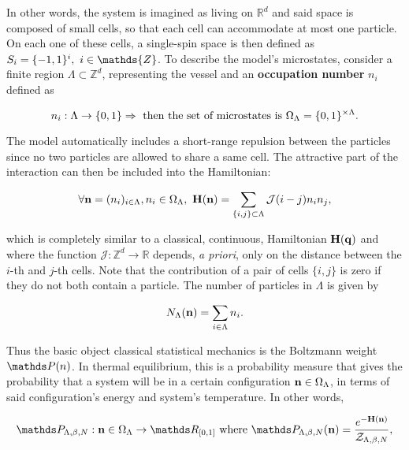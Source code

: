 \documentclass{homework}
\begin{document}
In other words, the system is imagined as living on $\mathds{R}^d$ and said space is composed of small cells, so that each cell can accommodate at most one particle. On each one of these cells, a single-spin space is then defined as $S_i = \{-1, 1\}^{i}, \blanky i \in \mathds{Z}$. To describe the model's microstates, consider a finite region $\Lambda \subset \mathds{Z}^d$, representing the vessel and an \textbf{occupation number} $n_i$ defined as 

\begin{equation}
    n_i : \Lambda \rightarrow \{0,1\} \Rightarrow \textnormal{ then the set of microstates is } \Omega_{\Lambda} = \{0, 1\}^{\times \Lambda}.
\end{equation}

The model automatically includes a short-range repulsion between the particles since no two particles are allowed to share a same cell. The attractive part of the interaction can then be included into the Hamiltonian:

$$
    \forall {\bf n} = (n_i)_{i \in \Lambda}, n_i \in \Omega_{\Lambda}, \textnormal{ } {\bf H}({\bf n}) = \sum_{\{i,j\} \subset \Lambda} \mathcal{J}(i-j) n_i n_j, 
$$

which is completely similar to a classical, continuous, Hamiltonian ${\bf H}({\bf q})$ and where the function $\mathcal{J}: \mathds{Z}^d \rightarrow \mathds{R}$ depends, \textit{a priori}, only on the distance between the $i$-th and $j$-th cells. Note that the contribution of a pair of cells $\{i,j\}$ is zero if they do not both contain a particle. The number of particles in $\Lambda$ is given by 

$$
    N_{\Lambda}({\bf n}) = \sum_{i\in\Lambda} n_i.
$$

Thus the basic object classical statistical mechanics is the Boltzmann weight $\prob(n)$. In thermal equilibrium, this is a probability measure that gives the probability that a system will be in a certain configuration ${\bf n} \in \Omega_{\Lambda}$, in terms of said configuration's energy and system's temperature. In other words,

\begin{equation}
    \begin{split}
        \prob_{\Lambda, \beta, N} :{\bf n} \in \Omega_{\Lambda}\rightarrow \R_{[0,1]} \textnormal{ where }
         \prob_{\Lambda, \beta, N} {(\bf n)} = \frac{e^{- {\bf H}({\bf n})}}{\mathcal{Z}_{\Lambda, \beta, N}},
    \end{split}
\end{equation}
\end{document}
